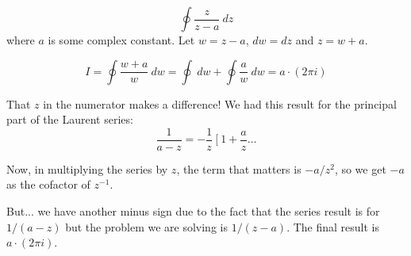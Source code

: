 \documentclass[11pt, oneside]{article}
\begin{document}
\[ \oint \frac{z}{z - a} \ dz \]
where $a$ is some complex constant.  Let $w = z - a$, $dw = dz$ and $z = w + a$.

\[ I = \oint \frac{w + a}{w} \ dw = \oint \ dw + \oint \frac{a}{w} \ dw = a \cdot (2 \pi i) \]

That $z$ in the numerator makes a difference!  We had this result for the principal part of the Laurent series:
\[ \frac{1}{a - z} = -\frac{1}{z} \ [ \ 1 + \frac{a}{z}  \dots \]

Now, in multiplying the series by $z$, the term that matters is $-a/z^2$, so we get $-a$ as the cofactor of $z^{-1}$.

But...  we have another minus sign due to the fact that the series result is for $1/(a - z)$ but the problem we are solving is $1/(z - a)$.  The final result is $a \cdot (2 \pi i)$.
\end{document}
